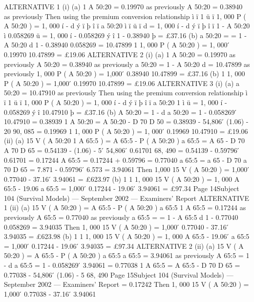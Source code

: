 \documentclass[a4paper,12pt]{article}
\begin{document}
\begin{enumerate}
ALTERNATIVE 1
(i)
(a)
1
A 50:20
= 0.19970 as previously
A 50:20 = 0.38940 as previously
Then using the premium conversion relationship
ì ï 1
ü ï
1, 000 P ( A 50:20 ) = 1, 000 í
- d ý
ï þ
î ï a 50:20
ì ï
ü ï
d
= 1, 000 í
- d ý
ï þ
î ï 1 - A 50:20
ì 0.058269
ü
= 1, 000 í
- 0.058269 ý
î 1 - 0.38940
þ
= £37.16
(b)
a 50:20 =
=
1 - A 50:20
d
1 - 0.38940
0.058269
= 10.47899
1
1, 000 P ( A 50:20
) =
1, 000  ́ 0.19970
10.47899
= £19.06
\newpage
ALTERNATIVE 2
(i)
(a)
1
A 50:20
= 0.19970 as previously
A 50:20 = 0.38940 as previously
a 50:20 =
1 - A 50:20
d
= 10.47899 as previously
1, 000 P ( A 50:20 ) = 1,000  ́
0.38940
10.47899
= £37.16
(b)
1
1, 000 P ( A 50:20
) = 1,000  ́
0.19970
10.47899
= £19.06
ALTERNATIVE 3
(i)
(a)
a 50:20 = 10.47910 as previously
Then using the premium conversion relationship
ì ï 1
ü ï
1, 000 P ( A 50:20 ) = 1, 000 í
- d ý
ï þ
î ï a 50:20
1
ì
ü
= 1, 000 í
- 0.058269 ý
î 10.47910
þ
= £37.16
(b)
A 50:20 = 1 - d a 50:20
= 1 - 0.058269  ́ 10.47910
= 0.38939
1
A 50:20
= A 50:20 -
D 70
D 50
= 0.38939 -
54,806
 ́ (1.06) - 20
90, 085
= 0.19969
1
1, 000 P ( A 50:20
) =
1, 000  ́ 0.19969
10.47910
= £19.06
(ii)
(a)
15 V ( A 50:20
1
A 65:5
) = A 65:5 - P ( A 50:20 ) a 65:5
= A 65 -
D 70
A 70
D 65
= 0.54139 - (1.06) - 5  ́
54,806
 ́ 0.61701
68, 490
= 0.54139 - 0.59796  ́ 0.61701
= 0.17244
A 65:5 = 0.17244 + 0.59796 = 0.77040
a 65:5 = a 65 -
D 70
a 70
D 65
= 7.871 - 0.59796  ́ 6.573
= 3.94061
Then 1,000 15 V ( A 50:20 ) = 1,000  ́ 0.77040 - 37.16  ́ 3.94061
= £623.97
(b)
1
1
1, 000 15 V ( A 50:20
) = 1, 000 A 65:5
- 19.06 a 65:5
= 1,000  ́ 0.17244 - 19.06  ́ 3.94061
= £97.34
Page 14Subject 104 (Survival Models) — September 2002 — Examiners’ Report
ALTERNATIVE 1
(ii)
(a)
15 V ( A 50:20
) = A 65:5 - P ( A 50:20 ) a 65:5
1
A 65:5
= 0.17244 as previously
A 65:5 = 0.77040 as previously
a 65:5 =
=
1 - A 65:5
d
1 - 0.77040
0.058269
= 3.94035
Then 1, 000 15 V ( A 50:20 ) = 1,000  ́ 0.77040 - 37.16  ́ 3.94035
= £623.98
(b)
1
1
1, 000 15 V ( A 50:20
) = 1, 000 A 65:5
- 19.06  ́ a 65:5
= 1,000  ́ 0.17244 - 19.06  ́ 3.94035
= £97.34
ALTERNATIVE 2
(ii)
(a)
15 V ( A 50:20
) = A 65:5 - P ( A 50:20 ) a 65:5
a 65:5 = 3.94061 as previously
A 65:5 = 1 - d a 65:5
= 1 - 0.058269  ́ 3.94061
= 0.77038
1
A 65:5
= A 65:5 -
D 70
D 65
= 0.77038 -
54,806
 ́ (1.06) - 5
68, 490
Page 15Subject 104 (Survival Models) — September 2002 — Examiners’ Report
= 0.17242
Then 1, 000 15 V ( A 50:20 ) = 1,000  ́ 0.77038 - 37.16  ́ 3.94061

\end{enumerate}
\end{document}
